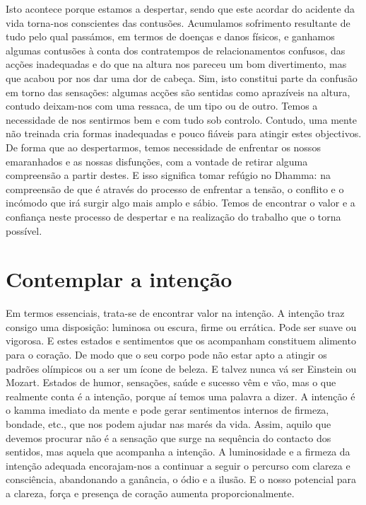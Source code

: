 Isto acontece porque estamos a despertar, sendo que este acordar do acidente da vida torna-nos conscientes das contusões. Acumulamos sofrimento resultante de tudo pelo qual passámos, em termos de doenças e danos físicos, e ganhamos algumas contusões à conta dos contratempos de relacionamentos confusos, das acções inadequadas e do que na altura nos pareceu um bom divertimento, mas que acabou por nos dar uma dor de cabeça. Sim, isto constitui parte da confusão em torno das sensações: algumas acções são sentidas como aprazíveis na altura, contudo deixam-nos com uma ressaca, de um tipo ou de outro. Temos a necessidade de nos sentirmos bem e com tudo sob controlo. Contudo, uma mente não treinada cria formas inadequadas e pouco fiáveis para atingir estes objectivos. De forma que ao despertarmos, temos necessidade de enfrentar os nossos emaranhados e as nossas disfunções, com a vontade de retirar alguma compreensão a partir destes. E isso significa tomar refúgio no Dhamma: na compreensão de que é através do processo de enfrentar a tensão, o conflito e o incómodo que irá surgir algo mais amplo e sábio. Temos de encontrar o valor e a confiança neste processo de despertar e na realização do trabalho que o torna possível.

\section{Contemplar a intenção}

Em termos essenciais, trata-se de encontrar valor na intenção. A intenção traz consigo uma disposição: luminosa ou escura, firme ou errática. Pode ser suave ou vigorosa. E estes estados e sentimentos que os acompanham constituem alimento para o coração. De modo que o seu corpo pode não estar apto a atingir os padrões olímpicos ou a ser um ícone de beleza. E talvez nunca vá ser Einstein ou Mozart. Estados de humor, sensações, saúde e sucesso vêm e vão, mas o que realmente conta é a intenção, porque aí temos uma palavra a dizer. A intenção é o kamma imediato da mente e pode gerar sentimentos internos de firmeza, bondade, etc., que nos podem ajudar nas marés da vida. Assim, aquilo que devemos procurar não é a sensação que surge na sequência do contacto dos sentidos, mas aquela que acompanha a intenção. A luminosidade e a firmeza da intenção adequada encorajam-nos a continuar a seguir o percurso com clareza e consciência, abandonando a ganância, o ódio e a ilusão. E o nosso potencial para a clareza, força e presença de coração aumenta proporcionalmente.

